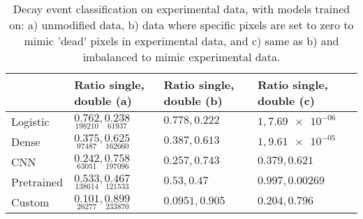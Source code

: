 \begin{table}
\centering
\caption{
Decay event classification on experimental data, with models trained on:
a) unmodified data, b) data where specific pixels are set to zero to mimic
'dead' pixels in experimental data, and c) same as b) and imbalanced to mimic experimental data.
}
\label{tab:classification-experimental-ratios}
\begin{tabular}{llll}
\toprule
{} &                                                                    Ratio single, double (a) &         Ratio single, double (b) &          Ratio single, double (c) \\
\midrule
Logistic   &  $\underset{\num{ 198210 }  }{\num{ 0.762 } }, \underset{\num{ 61937 }  }{\num{ 0.238 } }$ &  $\num{ 0.778 }, \num{ 0.222 }$ &  $\num{ 1 }, \num{ 7.69e-06 }$ \\
Dense      &  $\underset{\num{ 97487 }  }{\num{ 0.375 } }, \underset{\num{ 162660 }  }{\num{ 0.625 } }$ &  $\num{ 0.387 }, \num{ 0.613 }$ &  $\num{ 1 }, \num{ 9.61e-05 }$ \\
CNN        &  $\underset{\num{ 63051 }  }{\num{ 0.242 } }, \underset{\num{ 197096 }  }{\num{ 0.758 } }$ &  $\num{ 0.257 }, \num{ 0.743 }$ &  $\num{ 0.379 }, \num{ 0.621 }$ \\
Pretrained &  $\underset{\num{ 138614 }  }{\num{ 0.533 } }, \underset{\num{ 121533 }  }{\num{ 0.467 } }$ &  $\num{ 0.53 }, \num{ 0.47 }$ &  $\num{ 0.997 }, \num{ 0.00269 }$ \\
Custom     &  $\underset{\num{ 26277 }  }{\num{ 0.101 } }, \underset{\num{ 233870 }  }{\num{ 0.899 } }$ &  $\num{ 0.0951 }, \num{ 0.905 }$ &  $\num{ 0.204 }, \num{ 0.796 }$ \\
\bottomrule
\end{tabular}
\end{table}

